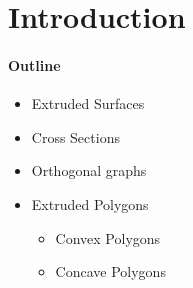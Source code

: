 \section{Introduction}
\label{sec:introduction}

\paragraph{Outline}
\begin{itemize}
    \item Extruded Surfaces
    \item Cross Sections
    \item Orthogonal graphs
    \item Extruded Polygons
    \begin{itemize}
        \item Convex Polygons
        \item Concave Polygons
    \end{itemize}
\end{itemize}
